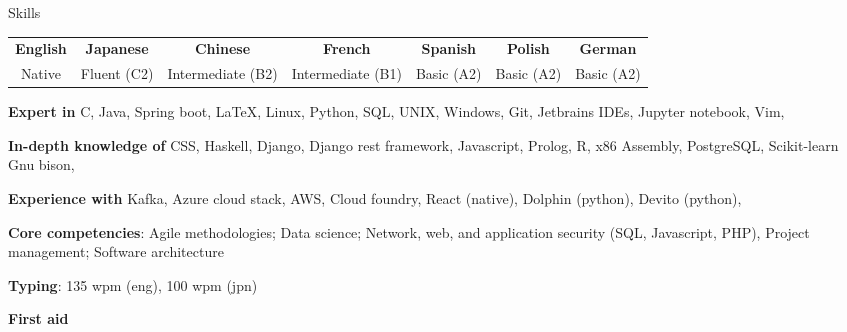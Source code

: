 \documentclass[10pt]{resume} %
\begin{document}
\begin{rSection}{Skills}

  \begin{center}
  \begin{tabular}{ c c c c c c c }
   \textbf{English} & \textbf{Japanese} & \textbf{Chinese} & \textbf{French} &
    \textbf{Spanish} & \textbf{Polish} & \textbf{German} \\
    Native & Fluent (C2) & Intermediate (B2) & Intermediate (B1) & Basic (A2) & Basic
    (A2) & Basic (A2)
  \end{tabular}
  \end{center}

  \item \textbf{Expert in}
    C,
    Java,
    Spring boot,
    \LaTeX,
    Linux,
    Python,
    SQL,
    UNIX,
    Windows,
    Git,
    Jetbrains IDEs,
    Jupyter notebook,
    Vim,

  \item \textbf{In-depth knowledge of}
    CSS,
    Haskell,
    Django,
    Django rest framework,
    Javascript,
    Prolog,
    R,
    x86 Assembly,
    PostgreSQL,
    Scikit-learn
    Gnu bison,

  \item \textbf{Experience with}
    Kafka,
    Azure cloud stack,
    AWS,
    Cloud foundry,
    React (native),
    Dolphin (python),
    Devito (python),

  \item \textbf{Core competencies}:
    Agile methodologies;
    Data science;
    Network, web, and application security (SQL, Javascript, PHP),
    Project management;
    Software architecture

  \item \textbf{Typing}: 135 wpm (eng), 100 wpm (jpn)

  \item \textbf{First aid}

\end{rSection}

\end{document}
